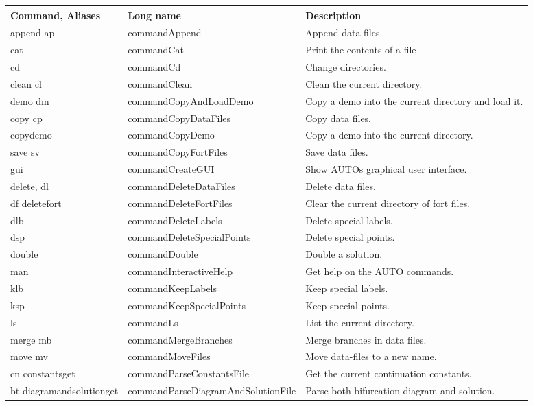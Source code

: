 \documentclass[12pt]{report}
\begin{document}
\begin{longtable}{|p{1.1in}|l|p{2.5in}|}
\hline 
Command, Aliases & Long name & Description\\ \hline 
append ap & commandAppend & Append data files.\\ \hline 
cat & commandCat & Print the contents of a file\\ \hline 
cd & commandCd & Change directories.\\ \hline 
clean cl & commandClean & Clean the current directory.\\ \hline 
demo dm & commandCopyAndLoadDemo & Copy a demo into the current directory and load it.\\ \hline 
copy cp & commandCopyDataFiles & Copy data files.\\ \hline 
copydemo & commandCopyDemo & Copy a demo into the current directory.\\ \hline 
save sv & commandCopyFortFiles & Save data files.\\ \hline 
gui & commandCreateGUI & Show AUTOs graphical user interface.\\ \hline 
delete, dl & commandDeleteDataFiles & Delete data files.\\ \hline 
df deletefort & commandDeleteFortFiles & Clear the current directory of fort files.\\ \hline 
dlb & commandDeleteLabels & Delete special labels.\\ \hline 
dsp & commandDeleteSpecialPoints & Delete special points.\\ \hline 
double & commandDouble & Double a solution.\\ \hline 
man & commandInteractiveHelp & Get help on the AUTO commands.\\ \hline 
klb & commandKeepLabels & Keep special labels.\\ \hline 
ksp & commandKeepSpecialPoints & Keep special points.\\ \hline 
ls & commandLs & List the current directory.\\ \hline 
merge mb & commandMergeBranches & Merge branches in data files. \\ \hline
move mv & commandMoveFiles & Move data-files to a new name.\\ \hline 
cn constantsget & commandParseConstantsFile & Get the current continuation constants.\\ \hline 
bt diagramandsolutionget & commandParseDiagramAndSolutionFile & Parse both bifurcation diagram and solution.\\ \hline 

\end{longtable}
\end{document}
